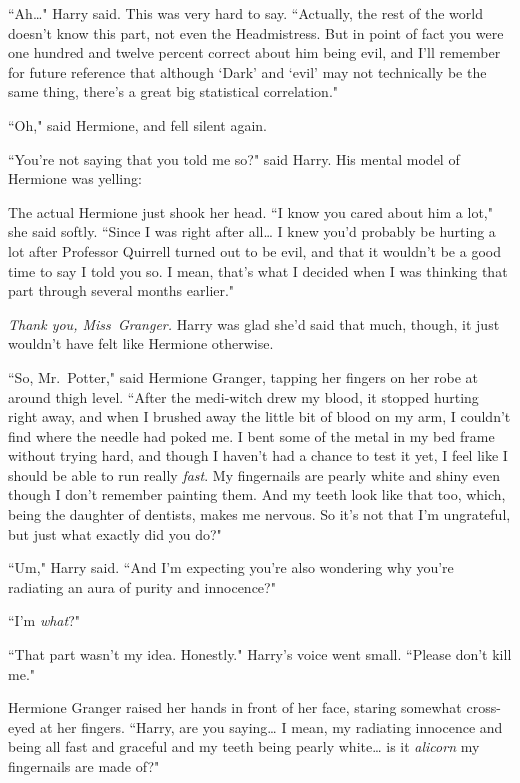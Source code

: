 ``Ah{\ldots}" Harry said. This was very hard to say. ``Actually, the rest of the world doesn't know this part, not even the Headmistress. But in point of fact you were one hundred and twelve percent correct about him being evil, and I'll remember for future reference that although `Dark' and `evil' may not technically be the same thing, there's a great big statistical correlation."

``Oh," said Hermione, and fell silent again.

``You're not saying that you told me so?" said Harry. His mental model of Hermione was yelling: 

The actual Hermione just shook her head. ``I know you cared about him a lot," she said softly. ``Since I was right after all{\ldots} I knew you'd probably be hurting a lot after Professor Quirrell turned out to be evil, and that it wouldn't be a good time to say I told you so. I mean, that's what I decided when I was thinking that part through several months earlier."

\emph{Thank you, Miss~Granger.} Harry was glad she'd said that much, though, it just wouldn't have felt like Hermione otherwise.

``So, Mr.~Potter," said Hermione Granger, tapping her fingers on her robe at around thigh level. ``After the medi-witch drew my blood, it stopped hurting right away, and when I brushed away the little bit of blood on my arm, I couldn't find where the needle had poked me. I bent some of the metal in my bed frame without trying hard, and though I haven't had a chance to test it yet, I feel like I should be able to run really \emph{fast}. My fingernails are pearly white and shiny even though I don't remember painting them. And my teeth look like that too, which, being the daughter of dentists, makes me nervous. So it's not that I'm ungrateful, but just what exactly did you do?"

``Um," Harry said. ``And I'm expecting you're also wondering why you're radiating an aura of purity and innocence?"

``I'm \emph{what}?"

``That part wasn't my idea. Honestly." Harry's voice went small. ``Please don't kill me."

Hermione Granger raised her hands in front of her face, staring somewhat cross-eyed at her fingers. ``Harry, are you saying{\ldots} I mean, my radiating innocence and being all fast and graceful and my teeth being pearly white{\ldots} is it \emph{alicorn} my fingernails are made of?"

